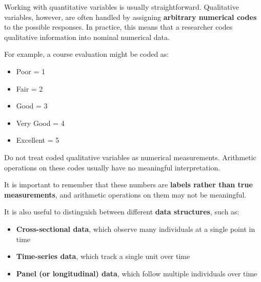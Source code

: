 \documentclass[
  letterpaper,
  DIV=11,
  numbers=noendperiod]{scrreprt}
\providecommand{\tightlist}{%
  \setlength{\itemsep}{0pt}\setlength{\parskip}{0pt}}
\begin{document}
Working with quantitative variables is usually straightforward.
Qualitative variables, however, are often handled by assigning
\textbf{arbitrary numerical codes} to the possible responses. In
practice, this means that a researcher codes qualitative information
into nominal numerical data.

For example, a course evaluation might be coded as:

\begin{itemize}
\tightlist
\item
  Poor = 1\\
\item
  Fair = 2\\
\item
  Good = 3\\
\item
  Very Good = 4\\
\item
  Excellent = 5
\end{itemize}

\begin{tcolorbox}[enhanced jigsaw, coltitle=black, colbacktitle=quarto-callout-warning-color!10!white, left=2mm, bottomrule=.15mm, bottomtitle=1mm, colback=white, titlerule=0mm, colframe=quarto-callout-warning-color-frame, breakable, leftrule=.75mm, toptitle=1mm, opacitybacktitle=0.6, rightrule=.15mm, title=\textcolor{quarto-callout-warning-color}{\faExclamationTriangle}\hspace{0.5em}{Common pitfall}, arc=.35mm, opacityback=0, toprule=.15mm]

Do not treat coded qualitative variables as numerical measurements.
Arithmetic operations on these codes usually have no meaningful
interpretation.

\end{tcolorbox}

It is important to remember that these numbers are \textbf{labels rather
than true measurements}, and arithmetic operations on them may not be
meaningful.

It is also useful to distinguish between different \textbf{data
structures}, such as:

\begin{itemize}
\tightlist
\item
  \textbf{Cross-sectional data}, which observe many individuals at a
  single point in time\\
\item
  \textbf{Time-series data}, which track a single unit over time\\
\item
  \textbf{Panel (or longitudinal) data}, which follow multiple
  individuals over time
\end{itemize}
\end{document}
